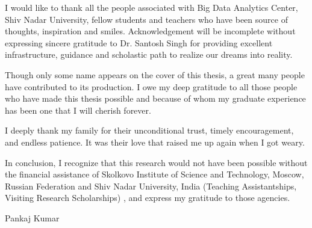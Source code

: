 I would like to thank all the people associated with Big Data Analytics Center, Shiv Nadar University, fellow students and teachers who have been source of thoughts, inspiration and smiles. Acknowledgement will be incomplete without expressing sincere gratitude to Dr. Santosh Singh for providing excellent infrastructure, guidance and scholastic path to realize our dreams into reality.

Though only some name appears on the cover of this thesis, a great many people have contributed to its production. I owe my deep gratitude to all those people who have made this thesis possible and because of whom my graduate experience has been one that I will cherish forever. 

I deeply thank my family for their unconditional trust, timely encouragement, and endless patience. It was their love that raised me up again when I got weary.

In conclusion, I recognize that this research would not have been possible without the financial assistance of Skolkovo Institute of Science and Technology, Moscow, Russian Federation and Shiv Nadar University, India (Teaching Assistantships, Visiting Research Scholarships) , and express my gratitude to those agencies.
   
\begin{flushright}
Pankaj Kumar
\end{flushright}



